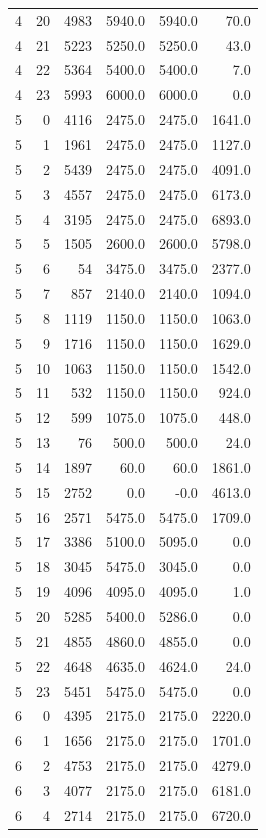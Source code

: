 \begin{longtable}{rrrrrr}
4 & 20 & 4983 & 5940.0 & 5940.0 & 70.0\\
4 & 21 & 5223 & 5250.0 & 5250.0 & 43.0\\
4 & 22 & 5364 & 5400.0 & 5400.0 & 7.0\\
4 & 23 & 5993 & 6000.0 & 6000.0 & 0.0\\
5 & 0 & 4116 & 2475.0 & 2475.0 & 1641.0\\
5 & 1 & 1961 & 2475.0 & 2475.0 & 1127.0\\
5 & 2 & 5439 & 2475.0 & 2475.0 & 4091.0\\
5 & 3 & 4557 & 2475.0 & 2475.0 & 6173.0\\
5 & 4 & 3195 & 2475.0 & 2475.0 & 6893.0\\
5 & 5 & 1505 & 2600.0 & 2600.0 & 5798.0\\
5 & 6 & 54 & 3475.0 & 3475.0 & 2377.0\\
5 & 7 & 857 & 2140.0 & 2140.0 & 1094.0\\
5 & 8 & 1119 & 1150.0 & 1150.0 & 1063.0\\
5 & 9 & 1716 & 1150.0 & 1150.0 & 1629.0\\
5 & 10 & 1063 & 1150.0 & 1150.0 & 1542.0\\
5 & 11 & 532 & 1150.0 & 1150.0 & 924.0\\
5 & 12 & 599 & 1075.0 & 1075.0 & 448.0\\
5 & 13 & 76 & 500.0 & 500.0 & 24.0\\
5 & 14 & 1897 & 60.0 & 60.0 & 1861.0\\
5 & 15 & 2752 & 0.0 & -0.0 & 4613.0\\
5 & 16 & 2571 & 5475.0 & 5475.0 & 1709.0\\
5 & 17 & 3386 & 5100.0 & 5095.0 & 0.0\\
5 & 18 & 3045 & 5475.0 & 3045.0 & 0.0\\
5 & 19 & 4096 & 4095.0 & 4095.0 & 1.0\\
5 & 20 & 5285 & 5400.0 & 5286.0 & 0.0\\
5 & 21 & 4855 & 4860.0 & 4855.0 & 0.0\\
5 & 22 & 4648 & 4635.0 & 4624.0 & 24.0\\
5 & 23 & 5451 & 5475.0 & 5475.0 & 0.0\\
6 & 0 & 4395 & 2175.0 & 2175.0 & 2220.0\\
6 & 1 & 1656 & 2175.0 & 2175.0 & 1701.0\\
6 & 2 & 4753 & 2175.0 & 2175.0 & 4279.0\\
6 & 3 & 4077 & 2175.0 & 2175.0 & 6181.0\\
6 & 4 & 2714 & 2175.0 & 2175.0 & 6720.0\\

\end{longtable}
